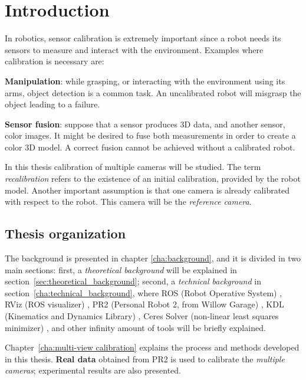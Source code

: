 \chapter{Introduction}
\label{cha:intro}

In robotics, sensor calibration is extremely important since a robot needs its sensors to measure and interact with the environment.
Examples where calibration is necessary are:
\begin{itemize*}
 \item \textbf{Manipulation}: while grasping, or interacting with the environment using its arms, object detection is a common task. An uncalibrated robot will misgrasp the object leading to a failure.

 \item \textbf{Sensor fusion}: suppose that a sensor produces 3D data, and another sensor, color images. It might be desired to fuse both measurements in order to create a color 3D model. A correct fusion cannot be achieved without a calibrated robot.
\end{itemize*}

\noindent
In this thesis calibration of multiple cameras will be studied. The term \textit{recalibration} refers to the existence of an initial calibration, provided by the robot model. Another important assumption is that one camera is already calibrated with respect to the robot. This camera will be the \textit{reference camera}.


\vspace*{-1ex}
\section{Thesis organization} %

The background is presented in chapter \ref{cha:background}, and it is divided in two main sections: first, a \textit{theoretical background} will be explained in section~\ref{sec:theoretical_background}; second, a \textit{technical background} in section~\ref{cha:technical_background}, where ROS (Robot Operative System) \cite{ROS}, RViz (ROS visualizer) \cite{RViz}, PR2 (Personal Robot 2, from Willow Garage) \cite{PR2}, KDL (Kinematics and Dynamics Library) \cite{KDL}, Ceres Solver (non-linear least squares minimizer) \cite{ceres}, and other infinity amount of tools will be briefly explained.

Chapter~\ref{cha:multi-view calibration} explains the process and methods developed in this thesis. \textbf{Real data} obtained from PR2 is used to calibrate the \textit{multiple cameras}; experimental results are also presented.

